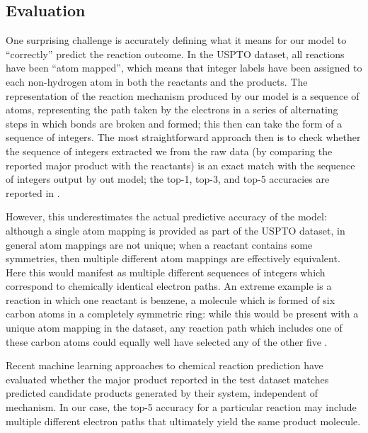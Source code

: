 
\subsection{Evaluation}

One surprising challenge is accurately defining what it means for our model to ``correctly'' predict the reaction outcome.
In the USPTO dataset, all reactions have been ``atom mapped'', which means that integer labels have been assigned to each non-hydrogen atom in both the reactants and the products.
The representation of the reaction mechanism produced by our model is a sequence of atoms, representing the path taken by the electrons in a series of alternating steps in which bonds are broken and formed; this then can take the form of a sequence of integers.
The most straightforward approach then is to check whether the sequence of integers extracted we from the raw data (by comparing the reported major product with the reactants) is an exact match with the sequence of integers output by out model; the top-1, top-3, and top-5 accuracies are reported in .

However, this underestimates the actual predictive accuracy of the model: 
although a single atom mapping is provided as part of the USPTO dataset, in general atom mappings are not unique; 
when a reactant contains some symmetries, then multiple different atom mappings are effectively equivalent.
Here this would manifest as multiple different sequences of integers which correspond to chemically identical electron paths.
An extreme example is a reaction in which one reactant is benzene, a molecule which is formed of six carbon atoms in a completely symmetric ring: while this would be present with a unique atom mapping in the dataset, any reaction path which includes one of these carbon atoms could equally well have selected any of the other five .

Recent machine learning approaches to chemical reaction prediction \citep{jin2017predicting,schwaller2017found}
have evaluated whether the major product reported in the test dataset matches predicted candidate products generated by their system, independent of mechanism.
In our case, the top-5 accuracy for a particular reaction may include multiple different electron paths that ultimately yield the same product molecule.

